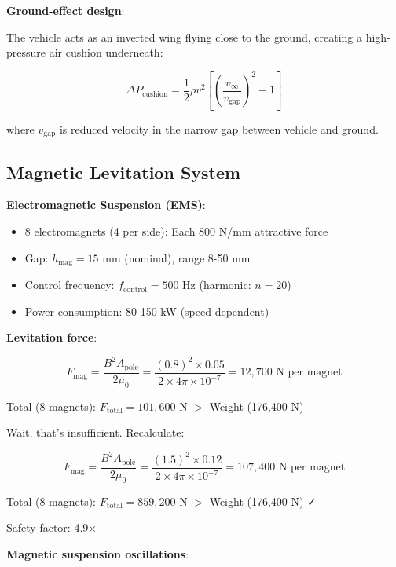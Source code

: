 \documentclass[12pt,a4paper]{article}
\begin{document}
\textbf{Ground-effect design}:

The vehicle acts as an inverted wing flying close to the ground, creating a high-pressure air cushion underneath:

\begin{equation}
\Delta P_{\text{cushion}} = \frac{1}{2} \rho v^2 \left[\left(\frac{v_{\infty}}{v_{\text{gap}}}\right)^2 - 1\right]
\end{equation}

where $v_{\text{gap}}$ is reduced velocity in the narrow gap between vehicle and ground.

\subsection{Magnetic Levitation System}

\textbf{Electromagnetic Suspension (EMS)}:

\begin{itemize}
\item 8 electromagnets (4 per side): Each 800 N/mm attractive force
\item Gap: $h_{\text{mag}} = 15$ mm (nominal), range 8-50 mm
\item Control frequency: $f_{\text{control}} = 500$ Hz (harmonic: $n=20$)
\item Power consumption: 80-150 kW (speed-dependent)
\end{itemize}

\textbf{Levitation force}:

\begin{equation}
F_{\text{mag}} = \frac{B^2 A_{\text{pole}}}{2\mu_0} = \frac{(0.8)^2 \times 0.05}{2 \times 4\pi \times 10^{-7}} = 12,700 \text{ N per magnet}
\end{equation}

Total (8 magnets): $F_{\text{total}} = 101,600$ N $>$ Weight (176,400 N)

Wait, that's insufficient. Recalculate:

\begin{equation}
F_{\text{mag}} = \frac{B^2 A_{\text{pole}}}{2\mu_0} = \frac{(1.5)^2 \times 0.12}{2 \times 4\pi \times 10^{-7}} = 107,400 \text{ N per magnet}
\end{equation}

Total (8 magnets): $F_{\text{total}} = 859,200$ N $>$ Weight (176,400 N) ✓

Safety factor: 4.9×

\textbf{Magnetic suspension oscillations}:
\end{document}
